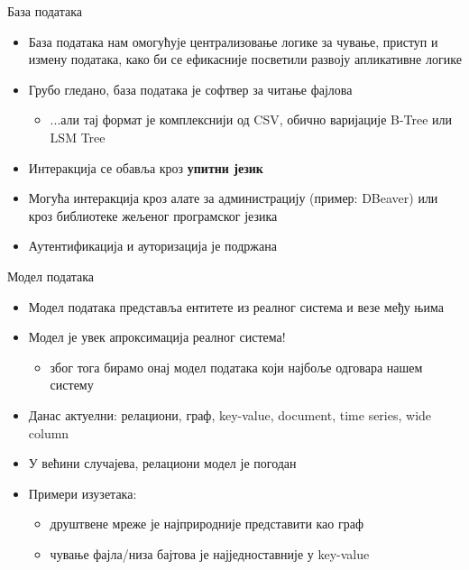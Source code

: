 \documentclass[aspectratio=169]{beamer}
\begin{document}
    \begin{frame}{База података}
        \begin{itemize}
            \item База података нам омогућује централизовање логике за чување, приступ и измену података, како би се ефикасније посветили развоју апликативне логике
            \item Грубо гледано, база података је софтвер за читање фајлова
            \begin{itemize}
                \item ...али тај формат је комплекснији од CSV, обично варијације B-Tree или LSM Tree
            \end{itemize}
            \item Интеракција се обавља кроз \textbf{упитни језик}
            \item Могућа интеракција кроз алате за администрацију (пример: DBeaver) или кроз библиотеке жељеног програмског језика
            \item Аутентификација и ауторизација је подржана
        \end{itemize}
    \end{frame}
    
    \begin{frame}{Модел података}
        \begin{itemize}
            \item Модел података представља ентитете из реалног система и везе међу њима
            \item Модел је увек апроксимација реалног система!
            \begin{itemize}
                \item због тога бирамо онај модел података који најбоље одговара нашем систему
            \end{itemize}
            \item Данас актуелни: релациони, граф, key-value, document, time series, wide column
            \item У већини случајева, релациони модел је погодан
            \item Примери изузетака:
            \begin{itemize}
                \item друштвене мреже је најприродније представити као граф
                \item чување фајла/низа бајтова је најједноставније у key-value
            \end{itemize}
        \end{itemize}
    \end{frame}
    
\end{document}

